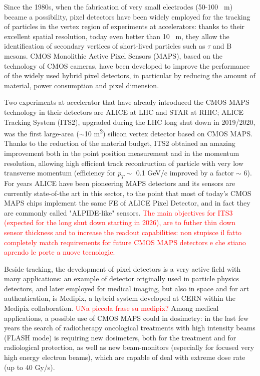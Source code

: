 \documentclass[a4paper]{report}
\newcommand{\red}[1]{\textcolor{red}{#1}}
\begin{document}
\linenumbers

Since the 1980s, when the fabrication of very small electrodes (50-100 \si{\mu m}) became a possibility, pixel detectors have been widely employed for the tracking of particles in the vertex region of experiments at accelerators: thanks to their excellent spatial resolution, today even better than 10 \si{\mu m}, they allow the identification of secondary vertices of short-lived particles such as $\tau$ and B mesons. 
CMOS Monolithic Active Pixel Sensors (MAPS), based on the technology of CMOS cameras, have been developed to improve the performance of the widely used hybrid pixel detectors, in particular by reducing the amount of material, power consumption and pixel dimension.  

Two experiments at accelerator that have already introduced the CMOS MAPS technology in their detectors are ALICE at LHC and STAR at RHIC; ALICE Tracking System (ITS2), upgraded during the LHC long shut down in 2019/2020, was the first large-area ($\sim$10 \si{m^2}) silicon vertex detector based on CMOS MAPS. Thanks to the reduction of the material budget, ITS2 obtained an amazing improvement both in the point position measurement and in the momentum resolution, allowing high efficient track recontruction of particle with very low transverse momentum (efficiency for $p_{T}\sim$ 0.1 \si{GeV/c} improved by a factor $\sim$ 6).
For years ALICE have been pioneering MAPS detectors and its sensors are currently state-of-the art in this sector, to the point that most of today's CMOS MAPS chips implement the same FE of ALICE Pixel Detector, and in fact they are commonly called "ALPIDE-like" sensors.
\red{The main objectives for ITS3 (expected for the long shut down starting in 2026), are to futher thin down sensor thickness and to increase the readout capabilities: non stupisce il fatto completely match requirements for future CMOS MAPS detectors e che stiano aprendo le porte a nuove tecnologie.}

Beside tracking, the development of pixel detectors is a very active field with many applications: an example of detector originally used in particle physics detectors, and later employed for medical imaging, but also in space and for art authentication, is Medipix, a hybrid system developed at CERN within the Medipix collaboration.
\red{UNa piccola frase su medipix?}
Among medical applications, a possible use of CMOS MAPS could in dosimetry: in the last few years the search of radiotherapy oncological treatments with high intensity beams (FLASH mode) is requiring new dosimeters, both for the treatment and for radiological protection, as well as new beam-monitors (especially for focused very high energy electron beams), which are capable of deal with extreme dose rate (up to 40 \si{Gy/s}).
\end{document}
